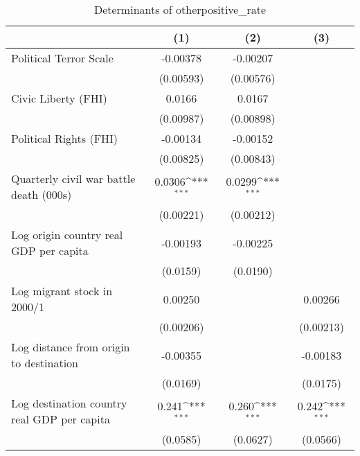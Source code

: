\begin{table}[htbp]\centering
\def\sym#1{\ifmmode^{#1}\else\(^{#1}\)\fi}
\caption{Determinants of otherpositive\_rate}
\begin{tabular}{l*{3}{c}}
\hline\hline
                    &\multicolumn{1}{c}{(1)}         &\multicolumn{1}{c}{(2)}         &\multicolumn{1}{c}{(3)}         \\
\hline
Political Terror Scale&    -0.00378         &    -0.00207         &                     \\
                    &   (0.00593)         &   (0.00576)         &                     \\
[1em]
Civic Liberty (FHI) &      0.0166         &      0.0167         &                     \\
                    &   (0.00987)         &   (0.00898)         &                     \\
[1em]
Political Rights (FHI)&    -0.00134         &    -0.00152         &                     \\
                    &   (0.00825)         &   (0.00843)         &                     \\
[1em]
Quarterly civil war battle death (000s)&      0.0306\sym{***}&      0.0299\sym{***}&                     \\
                    &   (0.00221)         &   (0.00212)         &                     \\
[1em]
Log origin country real GDP per capita&    -0.00193         &    -0.00225         &                     \\
                    &    (0.0159)         &    (0.0190)         &                     \\
[1em]
Log migrant stock in 2000/1&     0.00250         &                     &     0.00266         \\
                    &   (0.00206)         &                     &   (0.00213)         \\
[1em]
Log distance from origin to destination&    -0.00355         &                     &    -0.00183         \\
                    &    (0.0169)         &                     &    (0.0175)         \\
[1em]
Log destination country real GDP per capita&       0.241\sym{***}&       0.260\sym{***}&       0.242\sym{***}\\
                    &    (0.0585)         &    (0.0627)         &    (0.0566)         \\

\end{tabular}
\end{table}
